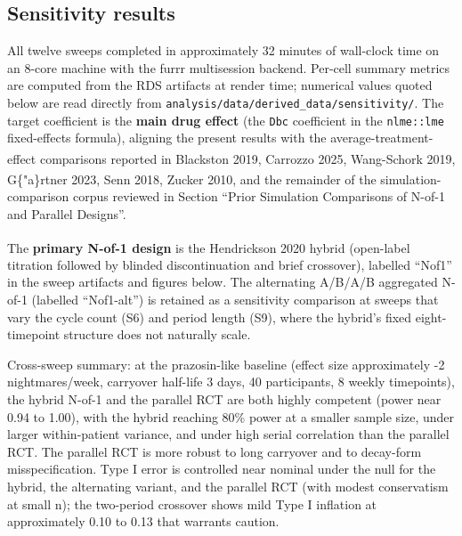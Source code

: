 \documentclass[
  11pt,
]{article}
\begin{document}
\subsection{Sensitivity results}\label{sensitivity-results}

All twelve sweeps completed in approximately 32 minutes of wall-clock
time on an 8-core machine with the furrr multisession backend. Per-cell
summary metrics are computed from the RDS artifacts at render time;
numerical values quoted below are read directly from
\texttt{analysis/data/derived\_data/sensitivity/}. The target
coefficient is the \textbf{main drug effect} (the \texttt{Dbc}
coefficient in the \texttt{nlme::lme} fixed-effects formula), aligning
the present results with the average-treatment-effect comparisons
reported in Blackston
2019\textsuperscript{},
Carrozzo 2025\textsuperscript{},
Wang-Schork
2019\textsuperscript{},
G\{"a\}rtner
2023\textsuperscript{}, Senn
2018\textsuperscript{},
Zucker
2010\textsuperscript{},
and the remainder of the simulation-comparison corpus reviewed in
Section ``Prior Simulation Comparisons of N-of-1 and Parallel Designs''.

The \textbf{primary N-of-1 design} is the Hendrickson
2020\textsuperscript{}
hybrid (open-label titration followed by blinded discontinuation and
brief crossover), labelled ``Nof1'' in the sweep artifacts and figures
below. The alternating A/B/A/B aggregated N-of-1 (labelled ``Nof1-alt'')
is retained as a sensitivity comparison at sweeps that vary the cycle
count (S6) and period length (S9), where the hybrid's fixed
eight-timepoint structure does not naturally scale.

Cross-sweep summary: at the prazosin-like baseline (effect size
approximately -2 nightmares/week, carryover half-life 3 days, 40
participants, 8 weekly timepoints), the hybrid N-of-1 and the parallel
RCT are both highly competent (power near 0.94 to 1.00), with the hybrid
reaching 80\% power at a smaller sample size, under larger
within-patient variance, and under high serial correlation than the
parallel RCT. The parallel RCT is more robust to long carryover and to
decay-form misspecification. Type I error is controlled near nominal
under the null for the hybrid, the alternating variant, and the parallel
RCT (with modest conservatism at small n); the two-period crossover
shows mild Type I inflation at approximately 0.10 to 0.13 that warrants
caution.
\end{document}
